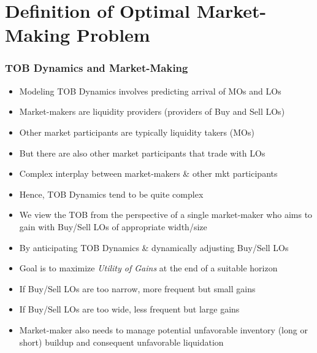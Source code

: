 \documentclass[handout]{beamer}
\begin{document}
\section{Definition of Optimal Market-Making Problem}

\begin{frame}
\frametitle{TOB Dynamics and Market-Making}
\pause
\begin{itemize}[<+->]
\item Modeling TOB Dynamics involves predicting arrival of MOs and LOs
\item Market-makers are liquidity providers (providers of Buy and Sell LOs)
\item Other market participants are typically liquidity takers (MOs)
\item But there are also other market participants that trade with LOs
\item Complex interplay between market-makers \& other mkt participants
\item Hence, TOB Dynamics tend to be quite complex
\item We view the TOB from the perspective of a single market-maker who aims to gain with Buy/Sell LOs of appropriate width/size
\item By anticipating TOB Dynamics \& dynamically adjusting Buy/Sell LOs
\item Goal is to maximize {\em Utility of Gains} at the end of a suitable horizon
\item If Buy/Sell LOs are too narrow, more frequent but small gains
\item If Buy/Sell LOs are too wide, less frequent but large gains
\item Market-maker also needs to manage potential unfavorable inventory (long or short) buildup and consequent unfavorable liquidation
\end{itemize}
\end{frame}
\end{document}

